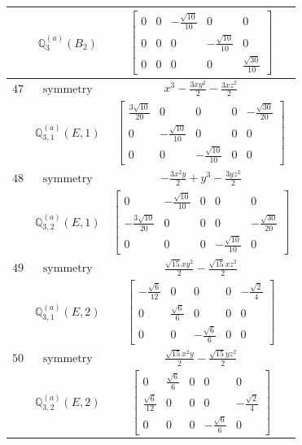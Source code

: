 \documentclass[fleqn,8pt,landscape]{jsarticle}
\begin{document}
\begin{longtable}{ccc}
$  $ & $ \mathbb{Q}_{3}^{(a)}(B_{2}) $ & $ \begin{bmatrix} 0 & 0 & - \frac{\sqrt{10}}{10} & 0 & 0 \\ 0 & 0 & 0 & - \frac{\sqrt{10}}{10} & 0 \\ 0 & 0 & 0 & 0 & \frac{\sqrt{30}}{10} \end{bmatrix} $ \\ \hline
$ 47 $ & $ \text{symmetry} $ & $ x^{3} - \frac{3 x y^{2}}{2} - \frac{3 x z^{2}}{2} $ \\
$  $ & $ \mathbb{Q}_{3,1}^{(a)}(E,1) $ & $ \begin{bmatrix} \frac{3 \sqrt{10}}{20} & 0 & 0 & 0 & - \frac{\sqrt{30}}{20} \\ 0 & - \frac{\sqrt{10}}{10} & 0 & 0 & 0 \\ 0 & 0 & - \frac{\sqrt{10}}{10} & 0 & 0 \end{bmatrix} $ \\ \hline
$ 48 $ & $ \text{symmetry} $ & $ - \frac{3 x^{2} y}{2} + y^{3} - \frac{3 y z^{2}}{2} $ \\
$  $ & $ \mathbb{Q}_{3,2}^{(a)}(E,1) $ & $ \begin{bmatrix} 0 & - \frac{\sqrt{10}}{10} & 0 & 0 & 0 \\ - \frac{3 \sqrt{10}}{20} & 0 & 0 & 0 & - \frac{\sqrt{30}}{20} \\ 0 & 0 & 0 & - \frac{\sqrt{10}}{10} & 0 \end{bmatrix} $ \\ \hline
$ 49 $ & $ \text{symmetry} $ & $ \frac{\sqrt{15} x y^{2}}{2} - \frac{\sqrt{15} x z^{2}}{2} $ \\
$  $ & $ \mathbb{Q}_{3,1}^{(a)}(E,2) $ & $ \begin{bmatrix} - \frac{\sqrt{6}}{12} & 0 & 0 & 0 & - \frac{\sqrt{2}}{4} \\ 0 & \frac{\sqrt{6}}{6} & 0 & 0 & 0 \\ 0 & 0 & - \frac{\sqrt{6}}{6} & 0 & 0 \end{bmatrix} $ \\ \hline
$ 50 $ & $ \text{symmetry} $ & $ \frac{\sqrt{15} x^{2} y}{2} - \frac{\sqrt{15} y z^{2}}{2} $ \\
$  $ & $ \mathbb{Q}_{3,2}^{(a)}(E,2) $ & $ \begin{bmatrix} 0 & \frac{\sqrt{6}}{6} & 0 & 0 & 0 \\ \frac{\sqrt{6}}{12} & 0 & 0 & 0 & - \frac{\sqrt{2}}{4} \\ 0 & 0 & 0 & - \frac{\sqrt{6}}{6} & 0 \end{bmatrix} $ \\ \hline

\end{longtable}
\end{document}
